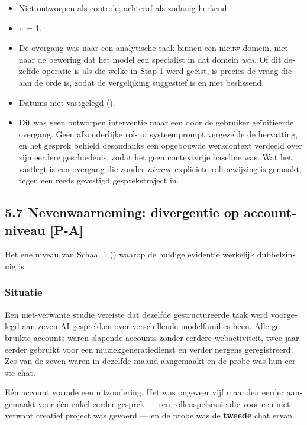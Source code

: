 \begin{dutch}
\begin{itemize}
  \item Niet ontworpen als controle; achteraf als zodanig herkend.
  \item n = 1.
  \item De overgang was naar een analytische taak binnen een nieuw domein, niet naar de bewering dat het model een specialist in dat domein \emph{was}. Of dit dezelfde operatie is als die welke in Stap 1 werd geëist, is precies de vraag die aan de orde is, zodat de vergelijking suggestief is en niet beslissend.
  \item Datums niet vastgelegd ().
  \item Dit was geen ontworpen interventie maar een door de gebruiker geïnitieerde overgang. Geen afzonderlijke rol- of systeemprompt vergezelde de hervatting, en het gesprek behield desondanks een opgebouwde werkcontext verdeeld over zijn eerdere geschiedenis, zodat het geen contextvrije baseline was. Wat het vastlegt is een overgang die zonder \emph{nieuwe} expliciete roltoewijzing is gemaakt, tegen een reeds gevestigd gesprekstraject in.
\end{itemize}

\subsection*{5.7 Nevenwaarneming: divergentie op accountniveau \textbf{[P-A]}}
\label{sec:nl:5.7}

Het ene niveau van Schaal 1 () waarop de huidige evidentie werkelijk dubbelzinnig is.


\subsubsection*{Situatie}
\label{sec:nl:x-situatie}

Een niet-verwante studie vereiste dat dezelfde gestructureerde taak werd voorgelegd aan zeven AI-gesprekken over verschillende modelfamilies heen. Alle gebruikte accounts waren slapende accounts zonder eerdere webactiviteit, twee jaar eerder gebruikt voor een muziekgeneratiedienst en verder nergens geregistreerd. Zes van de zeven waren in dezelfde maand aangemaakt en de probe was hun eerste chat.

Eén account vormde een uitzondering. Het was ongeveer vijf maanden eerder aangemaakt voor één enkel eerder gesprek — een rollenspelsessie die voor een niet-verwant creatief project was gevoerd — en de probe was de \textbf{tweede} chat ervan.



\end{dutch}
